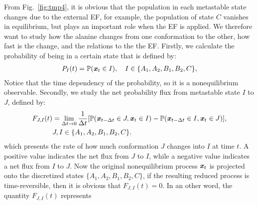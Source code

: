 \documentclass[a4paper,preprint,unsortedaddress,onecolumn]{revtex4-1}
\newcommand{\vect}[1]{\textbf{\textit{#1}}}
\newcommand{\fwd}[0]{\textrm{fwd}}
\newcommand{\bwd}[0]{\textrm{bwd}}
\begin{document}
From Fig.~\ref{fig:tmp4}, it is obvious that the population in each
metastable state changes due to the external EF, for
example, the population of state $C$ vanishes in equilibrium,
but plays an important role when the EF is applied. We
therefore want to study how the alanine changes from one conformation
to the other, how fast is the change, and the relations to the 
the EF. 
Firstly, we calculate the probability of being in a certain state that
is defined by:
\begin{align}
  P_I(t) = \mathbb P (\vect x_t \in I), \quad  I \in \{A_1, A_2, B_1, B_2, C\},
\end{align}
Notice that the time dependency of the probability, so it is
a nonequilibrium observable.
Secondly,
we study the net probability flux from metastable state $I$ to $J$, defined by:
\begin{align}\nonumber
  F_{J,I}(t) & =\lim_{\Delta t\rightarrow 0} \frac1{\Delta t} [\mathbb P( \vect x_{t-\Delta t} \in J, \vect x_t \in I) - \mathbb P( \vect x_{t-\Delta t} \in I, \vect x_t \in J)], \\\label{eqn:tmp7}
  & J,I \in \{A_1, A_2, B_1, B_2, C\}.
\end{align}
which presents the rate of how much conformation $J$ changes
into $I$ at time $t$. A positive value indicates the
net flux from $J$ to $I$,
while a negative value indicates a net flux from $I$ to $J$.
Now the original nonequilibrium process $\vect x_t$
is projected onto the discretized states $\{A_1, A_2, B_1, B_2, C\}$,
if the resulting reduced process 
is time-reversible, then it is obvious that
$ F_{J,I}(t) = 0$. In an other word, the quantity $ F_{J,I}(t) $ represents
\end{document}
